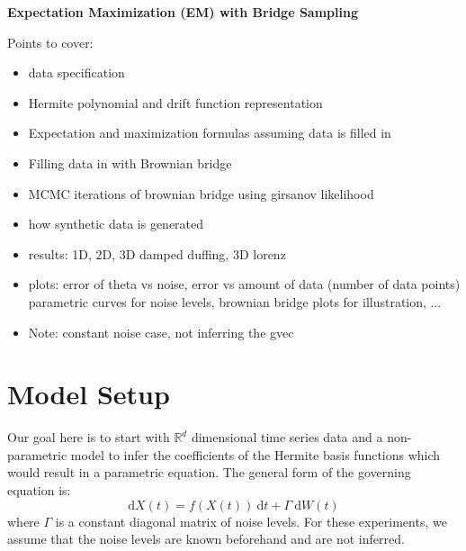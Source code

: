 \documentclass[12pt]{article}
\begin{document}
\begin{center}
\textbf{Expectation Maximization (EM) with Bridge Sampling}
\end{center}
Points to cover:
\begin{itemize}
\item data specification
\item Hermite polynomial and drift function representation
\item Expectation and maximization formulas assuming data is filled in
\item Filling data in with Brownian bridge
\item MCMC iterations of brownian bridge using girsanov likelihood
\item how synthetic data is generated
\item results: 1D, 2D, 3D damped duffing, 3D lorenz
\item plots: error of theta vs noise, error vs amount of data (number of data points) parametric curves for noise levels, brownian bridge plots for illustration, ...
\item Note: constant noise case, not inferring the gvec
\end{itemize}

\section{Model Setup}
Our goal here is to start with $\mathbb{R}^{d}$ dimensional time series data and a non-parametric model to infer the coefficients  of the Hermite basis functions which would result in a parametric equation. The general form of the governing equation is:
\begin{equation}
\mathrm{d} X(t) = f(X(t)) \: \mathrm{d} t + \Gamma \: \mathrm{d} W(t)
\end{equation}
where $\Gamma$ is a constant diagonal matrix of noise levels. For these experiments, we assume that the noise levels are known beforehand and are not inferred.
\end{document}
